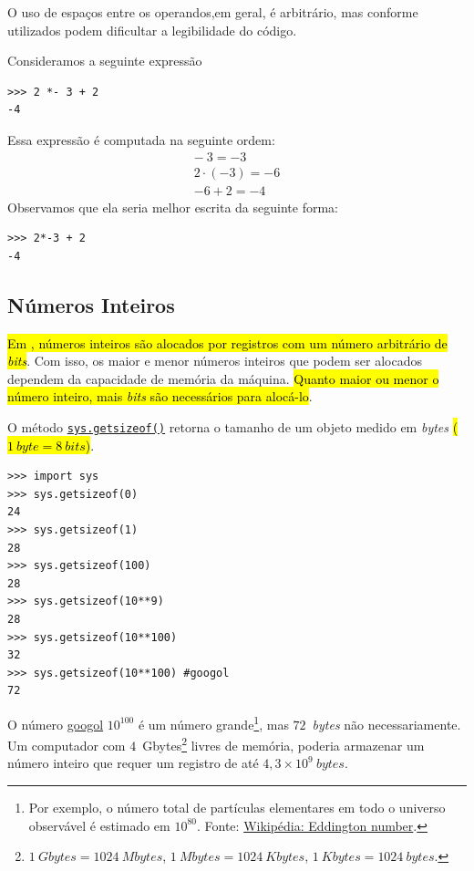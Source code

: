 O uso de espaços entre os operandos,em geral, é arbitrário, mas conforme utilizados podem dificultar a legibilidade do código.

\begin{ex}
  Consideramos a seguinte expressão
\begin{lstlisting}
>>> 2 *- 3 + 2
-4
\end{lstlisting}
  Essa expressão é computada na seguinte ordem:
  \begin{gather}
    -~3 = -3\\
    2\cdot(-3) = -6\\
    -6 + 2 = -4
  \end{gather}
  Observamos que ela seria melhor escrita da seguinte forma:
\begin{lstlisting}
>>> 2*-3 + 2
-4
\end{lstlisting}
\end{ex}

\subsection{Números Inteiros}

\hl{Em {\python}, números inteiros são alocados por registros com um número arbitrário de {\it bits}}. Com isso, os maior e menor números inteiros que podem ser alocados dependem da capacidade de memória da máquina. \hl{Quanto maior ou menor o número inteiro, mais {\it bits} são necessários para alocá-lo}.

\begin{ex}
  O método {\python} \href{https://docs.python.org/3/library/sys.html#sys.getsizeof}{\lstinline+sys.getsizeof()+} retorna o tamanho de um objeto medido em {\it bytes} \hl{($1~\textit{byte} = 8~\textit{bits}$)}.
\begin{lstlisting}
>>> import sys
>>> sys.getsizeof(0)
24
>>> sys.getsizeof(1)
28
>>> sys.getsizeof(100)
28
>>> sys.getsizeof(10**9)
28
>>> sys.getsizeof(10**100)
32
>>> sys.getsizeof(10**100) #googol
72
\end{lstlisting}

  O número \href{https://en.wikipedia.org/wiki/Googol}{googol} $10^{100}$ é um número grande\footnote{Por exemplo, o número total de partículas elementares em todo o universo observável é estimado em $10^80$. Fonte: \href{https://en.wikipedia.org/wiki/Eddington_number}{Wikipédia: Eddington number}.}, mas $72$~\textit{bytes} não necessariamente. Um computador com $4$~Gbytes\footnote{$1~\textit{Gbytes} = 1024~\textit{Mbytes}$, $1~\textit{Mbytes} = 1024~\textit{Kbytes}$, $1~\textit{Kbytes} = 1024~\textit{bytes}$.} livres de memória, poderia armazenar um número inteiro que requer um registro de até $4,3\times 10^9~\textit{bytes}$.
\end{ex}

